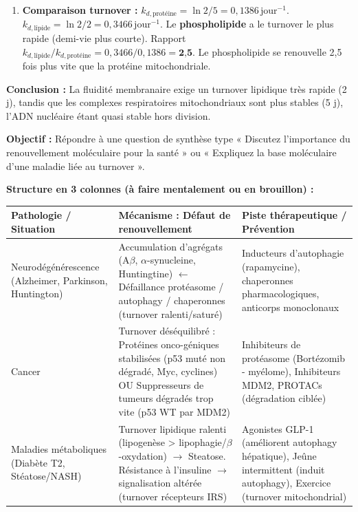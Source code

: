 \documentclass[11pt]{article}
\begin{document}
\begin{exoresolu}
\begin{enumerate}
    \item \textbf{Comparaison turnover :}
    $k_{d,\text{protéine}} = \ln 2 / 5 = 0{,}1386\,\text{jour}^{-1}$.
    $k_{d,\text{lipide}} = \ln 2 / 2 = 0{,}3466\,\text{jour}^{-1}$.
    Le \textbf{phospholipide} a le turnover le plus rapide (demi-vie plus courte).
    Rapport $k_{d,\text{lipide}} / k_{d,\text{protéine}} = 0{,}3466 / 0{,}1386 = \textbf{2{,}5}$.
    Le phospholipide se renouvelle 2,5 fois plus vite que la protéine mitochondriale.
\end{enumerate}
\textbf{Conclusion :} La fluidité membranaire exige un turnover lipidique très rapide (2 j), tandis que les complexes respiratoires mitochondriaux sont plus stables (5 j), l'ADN nucléaire étant quasi stable hors division.
\end{exoresolu}

\begin{methode}
\textbf{Objectif :} Répondre à une question de synthèse type « Discutez l'importance du renouvellement moléculaire pour la santé » ou « Expliquez la base moléculaire d'une maladie liée au turnover ».
\par
\textbf{Structure en 3 colonnes (à faire mentalement ou en brouillon) :}
\begin{center}
\begin{tabular}{|l|l|l|}\hline
\textbf{Pathologie / Situation} & \textbf{Mécanisme : Défaut de renouvellement} & \textbf{Piste thérapeutique / Prévention} \\ \hline
Neurodégénérescence (Alzheimer, Parkinson, Huntington) & Accumulation d'agrégats (A$\beta$, $\alpha$-synucleine, Huntingtine) $\leftarrow$ Défaillance protéasome / autophagy / chaperonnes (turnover ralenti/saturé) & Inducteurs d'autophagie (rapamycine), chaperonnes pharmacologiques, anticorps monoclonaux \\ \hline
Cancer & Turnover déséquilibré : Protéines onco-géniques stabilisées (p53 muté non dégradé, Myc, cyclines) OU Suppresseurs de tumeurs dégradés trop vite (p53 WT par MDM2) & Inhibiteurs de protéasome (Bortézomib - myélome), Inhibiteurs MDM2, PROTACs (dégradation ciblée) \\ \hline
Maladies métaboliques (Diabète T2, Stéatose/NASH) & Turnover lipidique ralenti (lipogenèse > lipophagie/$\beta$-oxydation) $\rightarrow$ Steatose. Résistance à l'insuline $\rightarrow$ signalisation altérée (turnover récepteurs IRS) & Agonistes GLP-1 (améliorent autophagy hépatique), Jeûne intermittent (induit autophagy), Exercice (turnover mitochondrial) \\ \hline

\end{tabular}
\end{center}
\end{methode}
\end{document}
